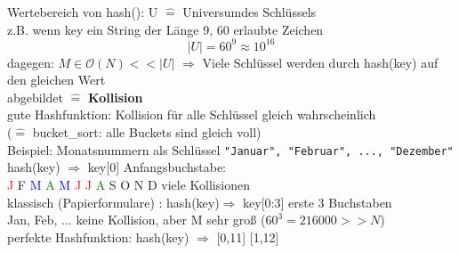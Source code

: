 \documentclass[11pt, fleqn]{scrreprt}
\begin{document}
Wertebereich von hash(): U $\widehat{=}$ \glqq Universum\grqq des Schlüssels \\
\hspace*{5mm} z.B. wenn key ein String der Länge 9, 60 erlaubte Zeichen \\
\[ |U| = 60^9 \approx 10^{16}\]
dagegen: $M \in \mathcal{O}(N) << |U|$ $\Rightarrow$ Viele Schlüssel werden durch hash(key) auf den gleichen Wert\\
\hspace*{15mm} abgebildet $\widehat{=}$ \textbf{Kollision}\\
gute Hashfunktion: Kollision für alle Schlüssel gleich wahrscheinlich \\
\hspace*{15mm} ($\widehat{=}$ bucket\_sort: alle Buckets sind gleich voll) \\

Beispiel: Monatsnummern als Schlüssel \verb|"Januar", "Februar", ..., "Dezember"| \\
hash(key) $\Rightarrow$ key[0] Anfangsbuchstabe: \\

\hspace*{10mm} \textcolor{red}{J} \hspace*{5mm}  F \hspace*{5mm}  \textcolor{blue}{M} \hspace*{5mm}  \textcolor{green}{A} \hspace*{5mm}  \textcolor{blue}{M} \hspace*{5mm}  \textcolor{red}{J} \hspace*{5mm}  \textcolor{red}{J} \hspace*{5mm}  \textcolor{green}{A} \hspace*{5mm} 
 S \hspace*{5mm}  O \hspace*{5mm}  N \hspace*{5mm}  D \hspace*{10mm} viele Kollisionen \\

klassisch (Papierformulare) : hash(key)$\Rightarrow$ key[0:3] erste 3 Buchstaben\\
\hspace*{5mm} Jan, Feb, ... \hspace*{2.3cm} keine Kollision, aber M sehr groß ($60^3 = 216000 >> N$) \\

perfekte Hashfunktion: hash(key) $\Rightarrow$ [0,11] \hspace*{5mm} [1,12] \\
\end{document}
